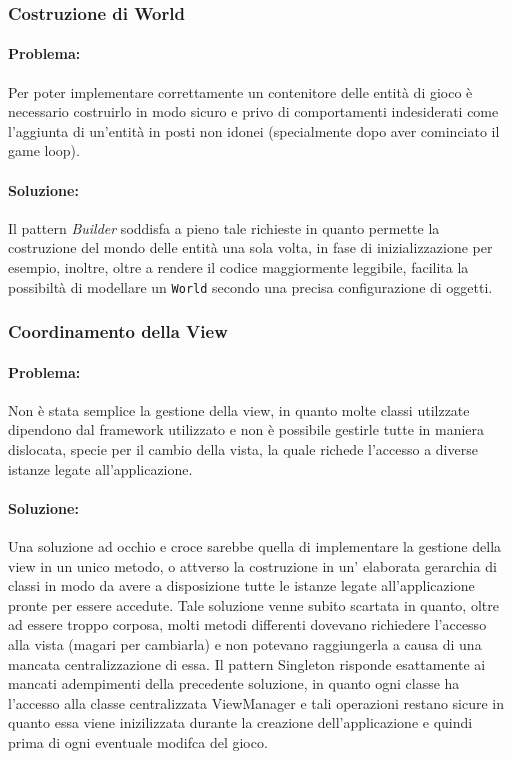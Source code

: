 \documentclass[a4paper,12pt]{report}
\begin{document}
	\subsubsection{Costruzione di World}
	
	\paragraph{Problema:} Per poter implementare correttamente un contenitore delle entità di gioco è necessario costruirlo in modo sicuro e privo di comportamenti indesiderati come l'aggiunta di un'entità in posti non idonei (specialmente dopo aver cominciato il game loop).
	
	\paragraph{Soluzione:} Il pattern \textit{Builder} soddisfa a pieno tale richieste in quanto permette la costruzione del mondo delle entità una sola volta, in fase di inizializzazione per esempio, inoltre, oltre a rendere il codice maggiormente leggibile, facilita la possibiltà di modellare un      \texttt{World} secondo una precisa configurazione di oggetti.
	
	
	\subsubsection{Coordinamento della View}
	
	\paragraph{Problema:} Non è stata semplice la gestione della view, in quanto molte classi utilzzate dipendono dal framework utilizzato e non è possibile gestirle tutte in maniera dislocata, specie per il cambio della vista, la quale richede l'accesso a diverse istanze legate all'applicazione.
	
	\paragraph{Soluzione:} Una soluzione ad occhio e croce sarebbe quella di implementare la gestione della view in un unico metodo, o attverso la costruzione in un' elaborata gerarchia di classi in modo da avere a disposizione tutte le istanze legate all'applicazione pronte per essere accedute. Tale soluzione venne subito scartata in quanto, oltre ad essere troppo corposa, molti metodi differenti dovevano richiedere 
	l'accesso alla vista (magari per cambiarla) e non potevano raggiungerla a causa di una mancata centralizzazione di essa. Il pattern {Singleton} risponde esattamente ai mancati adempimenti della precedente soluzione, in quanto ogni classe ha l'accesso alla classe centralizzata {ViewManager} e tali operazioni restano sicure in quanto essa viene inizilizzata durante la creazione dell'applicazione e quindi prima di ogni eventuale modifca del gioco.
	
\end{document}
